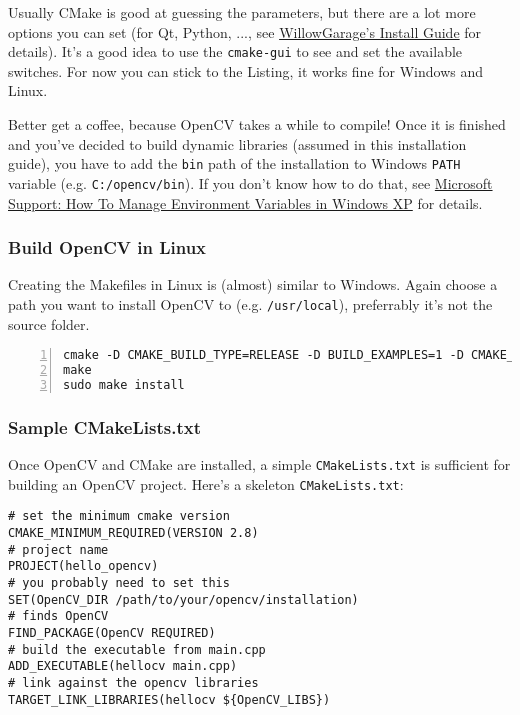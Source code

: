 Usually CMake is good at guessing the parameters, but there are a lot more options you can set (for Qt, Python, ..., see \href{http://opencv.willowgarage.com/wiki/InstallGuide}{WillowGarage's Install Guide} for details). It's a good idea to use the \lstinline|cmake-gui| to see and set the available switches. For now you can stick to the Listing, it works fine for Windows and Linux.

Better get a coffee, because OpenCV takes a while to compile! Once it is finished and you've decided to build dynamic libraries (assumed in this installation guide), you have to add the \lstinline|bin| path of the installation to Windows \lstinline|PATH| variable (e.g. \lstinline|C:/opencv/bin|). If you don't know how to do that, see \href{http://support.microsoft.com/kb/310519}{Microsoft Support: How To Manage Environment Variables in Windows XP} for details.

\subsubsection*{Build OpenCV in Linux}
Creating the Makefiles in Linux is (almost) similar to Windows. Again choose a path you want to install OpenCV to (e.g. \lstinline|/usr/local|), preferrably it's not the source folder.

\begin{lstlisting}[numberstyle=\footnotesize, numbers=left]
cmake -D CMAKE_BUILD_TYPE=RELEASE -D BUILD_EXAMPLES=1 -D CMAKE_INSTALL_PREFIX=/usr/local ..
make 
sudo make install
\end{lstlisting}

\subsubsection*{Sample CMakeLists.txt}
Once OpenCV and CMake are installed, a simple \lstinline|CMakeLists.txt| is sufficient for building an OpenCV project. Here's a skeleton \lstinline|CMakeLists.txt|:

\lstset{
	language=cmake,
}
\begin{lstlisting}
# set the minimum cmake version 
CMAKE_MINIMUM_REQUIRED(VERSION 2.8)
# project name
PROJECT(hello_opencv)
# you probably need to set this
SET(OpenCV_DIR /path/to/your/opencv/installation)
# finds OpenCV
FIND_PACKAGE(OpenCV REQUIRED)
# build the executable from main.cpp
ADD_EXECUTABLE(hellocv main.cpp)
# link against the opencv libraries
TARGET_LINK_LIBRARIES(hellocv ${OpenCV_LIBS})
\end{lstlisting}


